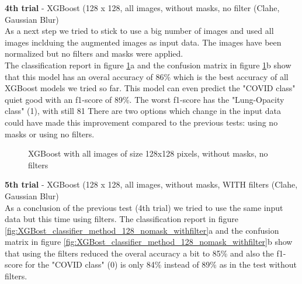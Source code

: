 \documentclass{article}
\begin{document}
\textbf{4th trial} - XGBoost (128 x 128, all images, without masks, no filter (Clahe, Gaussian Blur)\\
As a next step we tried to stick to use a big number of images and used all images inclduing the augmented images as input data. The images have been normalized but
no filters and masks were applied. \\
The classification report in figure \ref{fig:XGBost_classifier_method_128_nomask_nofilter}a and the confusion matrix in figure 
\ref{fig:XGBost_classifier_method_128_nomask_nofilter}b show that this model has an overal accuracy of 86\% which is the best accuracy of all XGBoost models we 
tried so far. This model can even predict the "COVID class" quiet good with an f1-score of 89\%. The worst f1-score has the "Lung-Opacity class" (1), with still 81%
There are two options which change in the input data could have made this improvement compared to the previous tests: using no masks or using no filters. 

\begin{figure}[!ht]
  \centering
  \qquad
  \caption{XGBoost with all images of size 128x128 pixels, without masks, no filters}
  \label{fig:XGBost_classifier_method_128_nomask_nofilter}
\end{figure}



\textbf{5th trial} - XGBoost (128 x 128, all images, without masks, WITH filters (Clahe, Gaussian Blur)\\
As a conclusion of the previous test (4th trial) we tried to use the same input data but this time using filters. The classification report in 
figure \ref{fig:XGBost_classifier_method_128_nomask_withfilter}a and the confusion matrix in figure \ref{fig:XGBost_classifier_method_128_nomask_withfilter}b show
that using the filters reduced the overal accuracy a bit to 85\% and also the f1-score for the "COVID class" (0) is only 84\% instead of 89\% as in the 
test without filters. 
\end{document}
